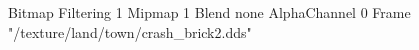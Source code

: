 {Bitmap
	{Filtering 1}
	{Mipmap 1}
	{Blend none}
	{AlphaChannel 0}
	{Frame "/texture/land/town/crash_brick2.dds"}
}

